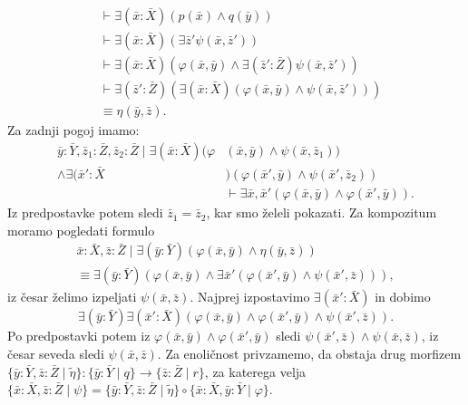\documentclass[../kategoricna_logika.tex]{subfiles}
\begin{document}
\begin{dokaz}
\begin{enumerate}[label=(\roman*)]
\begin{align*}
           &\vdash \exists (\bar{x}:\bar{X} )(p(\bar{x}) \land q(\bar{y})) \\
           &\vdash \exists (\bar{x}:\bar{X} ) (\exists \bar{z}' \psi(\bar{x},\bar{z}')) \\
           &\vdash \exists (\bar{x}:\bar{X} )(\varphi(\bar{x},\bar{y}) \land \exists (\bar{z}':\bar{Z}) \psi(\bar{x},\bar{z}')) \\
           &\vdash \exists (\bar{z}':\bar{Z}) ( \exists (\bar{x}:\bar{X})(\varphi(\bar{x},\bar{y}) \land \psi(\bar{x},\bar{z}'))) \\
           &\equiv \eta(\bar{y},\bar{z}).
    \end{align*}
    Za zadnji pogoj imamo:
\begin{align*}
  \bar{y}:\bar{Y},\bar{z}_{1}:\bar{Z},\bar{z}_{2}:\bar{Z} \mid
  \exists (\bar{x}:\bar{X})(\varphi&(\bar{x},\bar{y}) \land \psi(\bar{x},\bar{z}_1)) \\
  \land \exists (\bar{x}':\bar{X}&)
  (\varphi(\bar{x}',\bar{y}) \land \psi(\bar{x}',\bar{z}_2)) \\
  &\vdash \exists
      \bar{x},\bar{x}'(\varphi(\bar{x},\bar{y}) \land \varphi(\bar{x}',\bar{y})).
      \end{align*}
    Iz predpostavke potem
    sledi $\bar{z}_1 = \bar{z}_2$, kar smo želeli pokazati.
    Za kompozitum moramo pogledati formulo
\begin{multline*}
  \bar{x}:\bar{X},\bar{z}:\bar{Z} \mid \exists (\bar{y}:\bar{Y})(\varphi(\bar{x},\bar{y}) \land \eta(\bar{y},\bar{z})) \\
  \equiv \exists
      (\bar{y}:\bar{Y})(\varphi(\bar{x},\bar{y}) \land \exists \bar{x}'(\varphi(\bar{x}',\bar{y}) \land \psi(\bar{x}',\bar{z}))
      ),
      \end{multline*}
    iz česar želimo izpeljati $\psi(\bar{x},\bar{z})$. Najprej izpostavimo
    $\exists (\bar{x}':\bar{X})$ in dobimo
    \[\exists (\bar{y}:\bar{Y}) \exists (\bar{x}':\bar{X})( \varphi(\bar{x},\bar{y}) \land \varphi(\bar{x}',\bar{y}) \land
      \psi(\bar{x}',\bar{z})). \]
    Po predpostavki potem iz
    $\varphi(\bar{x},\bar{y}) \land \varphi(\bar{x}',\bar{y})$ sledi
    $\psi(\bar{x}',\bar{z}) \land \psi(\bar{x},\bar{z})$, iz česar seveda sledi $\psi(\bar{x},\bar{z})$.
    Za enoličnost privzamemo, da obstaja drug morfizem
    $\{\bar{y}:\bar{Y},\bar{z}:\bar{Z} \mid \tilde{\eta}\} : \{\bar{y}:\bar{Y} \mid q\} \to \{\bar{z}:\bar{Z} \mid r\}$,
    za katerega velja
    $\{\bar{x}:\bar{X},\bar{z}:\bar{Z} \mid \psi\} =
    \{\bar{y}:\bar{Y},\bar{z}:\bar{Z} \mid \tilde{\eta}\} \circ \{\bar{x}:\bar{X},\bar{y}:\bar{Y} \mid \varphi \}$.

\end{enumerate}
\end{dokaz}
\end{document}
